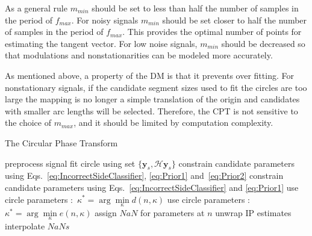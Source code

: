 \documentclass[journal,11pt,a4paper,onecolumn,draftcls]{IEEEtran}
\begin{document}
As a general rule $m_{min}$ should be set to less than half the number of samples in the period of $f_{max}$. For noisy signals $m_{min}$ should be set closer to half the number of samples in the period of $f_{max}$. This provides the optimal number of points for estimating the tangent vector. For low noise signals, $m_{min}$ should be decreased so that modulations and nonstationarities can be modeled more accurately. 

As mentioned above, a property of the DM is that it prevents over fitting. For nonstationary signals, if the candidate segment sizes used to fit the circles are too large the mapping is no longer a simple translation of the origin and candidates with smaller arc lengths will be selected. Therefore, the CPT is not sensitive to the choice of $m_{max}$, and it should be limited by computation complexity.

\begin{algorithm}
\caption{The Circular Phase Transform}\label{CPTAlgorithm}
\begin{algorithmic}[1]
\State preprocess signal
        \State fit circle using set $\{\mathbf{y}_s,\mathcal{H}\mathbf{y}_s\}$
    \EndFor
            \State constrain candidate parameters using Eqs.~\ref{eq:IncorrectSideClassifier}, \ref{eq:Prior1} and~\ref{eq:Prior2}
        \Else
            \State constrain candidate parameters using Eqs.~\ref{eq:IncorrectSideClassifier} and \ref{eq:Prior1}
        \EndIf
            \State use circle parameters $:$ ${\kappa^ * } = \arg \mathop {\min }\limits_\kappa d\left( n,\kappa \right)$
        \Else
            \State use circle parameters $:$ ${\kappa^ * } = \arg \mathop {\min }\limits_\kappa e\left( n,\kappa \right)$
        \EndIf
    \Else
        \State assign $NaN$ for parameters at $n$
    \EndIf
\EndFor
\State unwrap IP estimates
\State interpolate $NaNs$
\end{algorithmic}
\end{algorithm}
\end{document}
